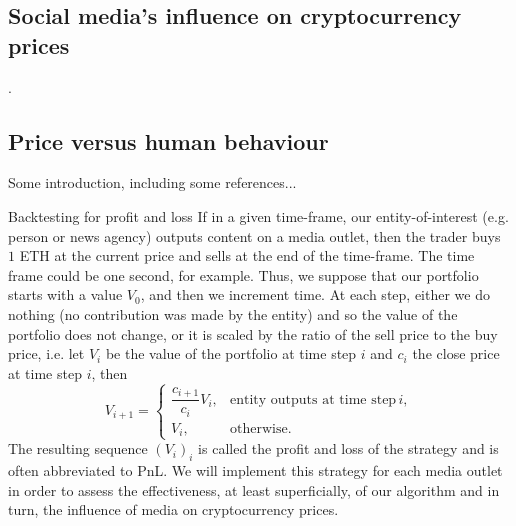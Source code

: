 \documentclass[twoside]{report}
\begin{document}
\begin{spacing}{1}
\chapter{Social media's influence on cryptocurrency prices}
.
\section{Price versus human behaviour}\label{sec:pricevshumanbehaviour}
Some introduction, including some references...

Backtesting for profit and loss
\label{PnLgeneralstrat}
If in a given time-frame, our entity-of-interest (e.g. person or news agency) outputs content on a media outlet, then the trader buys $1$ ETH at the current price and sells at the end of the time-frame. The time frame could be one second, for example. Thus, we suppose that our portfolio starts with a value $V_0$, and then we increment time. At each step, either we do nothing (no contribution was made by the entity) and so the value of the portfolio does not change, or it is scaled by the ratio of the sell price to the buy price, i.e. let $V_i$ be the value of the portfolio at time step $i$ and $c_i$ the close price at time step $i$, then \[
V_{i+1} = \begin{cases}
\dfrac{c_{i+1}}{c_i}V_i, & \text{entity outputs at time step}\, i,\\
V_i, & \text{otherwise}.
\end{cases}
\] 
The resulting sequence $(V_i)_i$ is called the profit and loss of the strategy and is often abbreviated to PnL. We will implement this strategy for each media outlet in order to assess the effectiveness, at least superficially, of our algorithm and in turn, the influence of media on cryptocurrency prices. 




\end{spacing}
\end{document}
